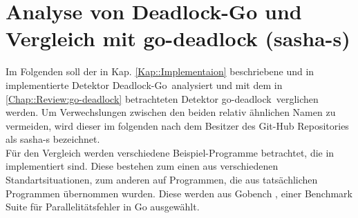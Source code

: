 \chapter{Analyse von Deadlock-Go und Vergleich mit 
    go-deadlock (sasha-s)}
Im Folgenden soll der in Kap. \ref{Kap::Implementaion} beschriebene und in 
\cite{implementation} implementierte Detektor \glqq Deadlock-Go\grqq\ analysiert 
und mit dem in 
\ref{Chap::Review:go-deadlock} betrachteten Detektor \glqq go-deadlock\grqq\ verglichen
werden. Um Verwechslungen zwischen den beiden relativ ähnlichen Namen zu vermeiden,
wird dieser im folgenden nach dem Besitzer des Git-Hub Repositories als sasha-s
bezeichnet.\\
Für den Vergleich werden verschiedene Beispiel-Programme betrachtet, die in 
\cite{examples} implementiert sind. Diese bestehen zum einen aus verschiedenen 
Standartsituationen, zum anderen auf Programmen, die aus tatsächlichen
Programmen übernommen wurden. Diese werden aus Gobench \cite{gobench}, einer 
Benchmark Suite für Parallelitätsfehler in Go ausgewählt.
